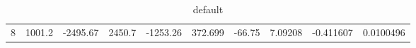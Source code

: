\begin{table}[t]
	\begin{center}
		\begin{tabular}{llllllllll}
		  8 & 1001.2 & -2495.67 & 2450.7 & -1253.26 & 372.699 & -66.75 & 7.09208 & -0.411607 & 0.0100496
		\end{tabular}
	\end{center}
	\caption{default}
\end{table}%

\endinput  %


